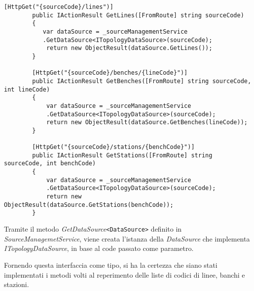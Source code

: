 \begin{lstlisting}[caption={TopologyController.cs}, style=javaScriptCode]
        [HttpGet("{sourceCode}/lines")]
        public IActionResult GetLines([FromRoute] string sourceCode)
        {
           var dataSource = _sourceManagementService
           .GetDataSource<ITopologyDataSource>(sourceCode);
            return new ObjectResult(dataSource.GetLines());
        }

        [HttpGet("{sourceCode}/benches/{lineCode}")]
        public IActionResult GetBenches([FromRoute] string sourceCode, int lineCode)
        {
            var dataSource = _sourceManagementService
            .GetDataSource<ITopologyDataSource>(sourceCode);
            return new ObjectResult(dataSource.GetBenches(lineCode));
        }

        [HttpGet("{sourceCode}/stations/{benchCode}")]
        public IActionResult GetStations([FromRoute] string sourceCode, int benchCode)
        {
            var dataSource = _sourceManagementService
            .GetDataSource<ITopologyDataSource>(sourceCode);
            return new ObjectResult(dataSource.GetStations(benchCode));
        }
\end{lstlisting}
Tramite il metodo \textit{GetDataSource}\verb|<DataSource>| definito in \textit{SourceManagemetService}, viene creata l'istanza della \textit{DataSource} che implementa \textit{ITopologyDataSource}, in base al code passato come parametro.

Fornendo questa interfaccia come tipo, si ha la certezza che siano stati implementati i metodi volti al reperimento delle liste di codici di linee, banchi e stazioni.
\newpage